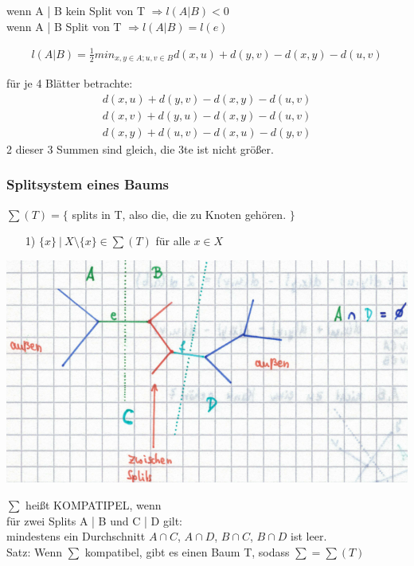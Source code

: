wenn A | B kein Split von T $\Rightarrow l(A|B) < 0$\\
wenn A | B Split von T $\Rightarrow l(A|B) = l(e)$ 

\begin{align*}
 	l(A|B) = \frac{1}{2} min_{x,y \in A; u,v \in B} d(x,u) + d(y,v) - d(x,y) - d(u,v)
\end{align*}

\newpage

für je 4 Blätter betrachte:\\
\begin{align*}
 	d(x,u) + d(y,v) - d(x,y) - d(u,v)\\
 	d(x,v) + d(y,u) - d(x,y) - d(u,v)\\
 	d(x,y) + d(u,v) - d(x,u) - d(y,v)
\end{align*}
2 dieser 3 Summen sind gleich, die 3te ist nicht größer.\\

\subsubsection{Splitsystem eines Baums}

$\sum (T) = \{$ splits in T, also die, die zu Knoten gehören. $\}$

\begin{enumerate}
	\item[1)] $ \{ x \}~|~X \setminus \{ x \} \in \sum (T)$ für alle $x \in X$
\end{enumerate}

\begin{center}
	\includegraphics[scale=0.6]{lectures/161209/pix/splitsystem}
\end{center}

$\sum$ heißt KOMPATIPEL, wenn \\
für zwei Splits A | B und C | D gilt:\\
mindestens ein Durchschnitt $A \cap C$, $A \cap D$, $B \cap C$, $B \cap D$ ist leer.\\

Satz: Wenn $\sum$ kompatibel, gibt es einen Baum T, sodass $\sum = \sum(T)$